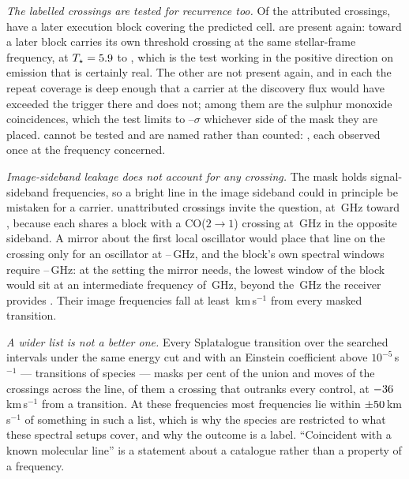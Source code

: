 \emph{The labelled crossings are tested for recurrence too.} Of the
\MkAttrSO{} attributed crossings, \MkAttrTested{} have a later execution block
covering the predicted cell. \MkAttrRecur{} are present again: toward
\MkAttrRecurStars{} a later block carries its own threshold crossing at the
same stellar-frame frequency, at $T_\star=5.9$ to
\MkAttrRecurTHi, which is the test working in the positive direction on
emission that is certainly real. The other \MkAttrExcl{} are not present
again, and in each the repeat coverage is deep enough that a carrier at the
discovery flux would have exceeded the trigger there and does not; among them
are the sulphur monoxide coincidences, which the test limits to
\MkAttrExclLo--\MkAttrExclHi$\sigma$ whichever side of the mask they are
placed. \MkAttrUntest{} cannot be tested and are
named rather than counted: \MkAttrUntestNames, each observed once at the
frequency concerned.

\emph{Image-sideband leakage does not account for any crossing.} The mask
holds signal-sideband frequencies, so a bright line in the image sideband
could in principle be mistaken for a carrier. \MkImgN{} unattributed
crossings invite the question, at \MkImgFreqs\,GHz toward \MkImgStar, because
each shares a block with a CO($2\to1$) crossing at \MkImgPartner\,GHz in the
opposite sideband. A mirror about the first local oscillator would place that
line on the crossing only for an oscillator at
\MkImgLOReqLo--\MkImgLOReqHi\,GHz, and the block's own spectral windows
require \MkImgLOLo--\MkImgLOHi\,GHz: at the setting the mirror needs, the
lowest window of the block would sit at an intermediate frequency of
\MkImgIFReq\,GHz, beyond the \MkImgIFMax\,GHz the receiver provides
\citep{ALMAHandbook}. Their image frequencies fall at least
\MkImgDvMin\,km\,s$^{-1}$ from every masked transition.

\emph{A wider list is not a better one.} Every Splatalogue transition over the
searched intervals under the same energy cut and with an Einstein coefficient
above $10^{-5}$\,s$^{-1}$ --- \MaskDbTrans{} transitions of \MaskDbCarriers{}
species --- masks \MaskDbPctUnion{} per cent of the union and moves
\FrFullNFlip{} of the \NCross{} crossings across the line,
\FrFullNFlipRankWord{} of them a crossing that outranks every control, at
$-36$\,km\,s$^{-1}$ from a \FrFullFlipRankChem{} transition. At
these frequencies most frequencies lie within $\pm50$\,km\,s$^{-1}$
of something in such a list, which is why the species are restricted to what
these spectral setups cover, and why the outcome is a label. ``Coincident
with a known molecular line'' is a statement about a catalogue rather than a
property of a frequency.
